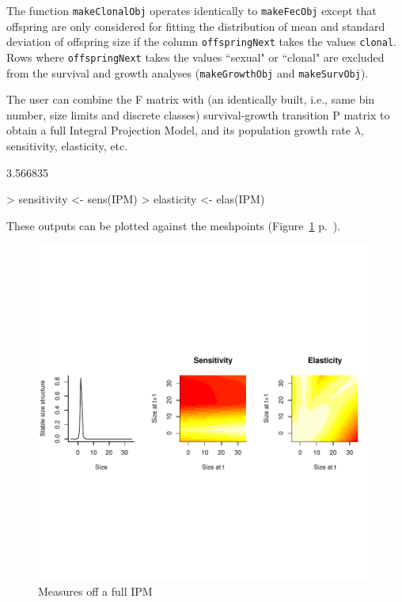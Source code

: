 \documentclass{article}
\begin{document}
The function {\tt makeClonalObj} operates identically to {\tt makeFecObj} except that offspring are only considered for fitting the distribution of mean and standard deviation of offspring size if the column {\tt offspringNext} takes the values {\tt clonal}. Rows where {\tt offspringNext} takes the values ``sexual" or ``clonal" are excluded from the survival and growth analyses ({\tt makeGrowthObj} and {\tt makeSurvObj}).

The user can combine the F matrix with (an identically built, i.e., same bin number, size limits and discrete classes) survival-growth transition P matrix to obtain a full Integral Projection Model, and its population growth rate $\lambda$, sensitivity, elasticity, etc. 
\begin{Schunk}
\begin{Soutput}
[1] 3.566835
\end{Soutput}
\begin{Sinput}
> sensitivity <- sens(IPM)
> elasticity <- elas(IPM)
\end{Sinput}
\end{Schunk}
These outputs can be plotted against the meshpoints (Figure~\ref{fig:four} p.~\pageref{fig:four}).
\begin{figure}
\begin{center}
\includegraphics{IPMpack_Vignette-fig4}
\end{center}
\caption{Measures off a full IPM}
\label{fig:four}
\end{figure}
\end{document}
